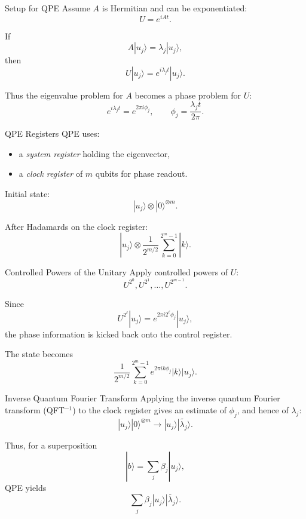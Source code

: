 \documentclass{beamer}
\begin{document}
\begin{frame}{Setup for QPE}
Assume \(A\) is Hermitian and can be exponentiated:
\[
U = e^{iAt}.
\]

If
\[
A|u_j\rangle = \lambda_j |u_j\rangle,
\]
then
\[
U|u_j\rangle = e^{i\lambda_j t}|u_j\rangle.
\]

Thus the eigenvalue problem for \(A\) becomes a phase problem for \(U\):
\[
e^{i\lambda_j t} = e^{2\pi i \phi_j},
\qquad
\phi_j = \frac{\lambda_j t}{2\pi}.
\]
\end{frame}


\begin{frame}{QPE Registers}
QPE uses:
\begin{itemize}
\item a \emph{system register} holding the eigenvector,
\item a \emph{clock register} of \(m\) qubits for phase readout.
\end{itemize}

Initial state:
\[
|u_j\rangle \otimes |0\rangle^{\otimes m}.
\]

After Hadamards on the clock register:
\[
|u_j\rangle \otimes
\frac{1}{2^{m/2}}
\sum_{k=0}^{2^m-1} |k\rangle.
\]
\end{frame}


\begin{frame}{Controlled Powers of the Unitary}
Apply controlled powers of \(U\):
\[
U^{2^0}, U^{2^1}, \dots, U^{2^{m-1}}.
\]

Since
\[
U^{2^\ell}|u_j\rangle = e^{2\pi i 2^\ell \phi_j}|u_j\rangle,
\]
the phase information is kicked back onto the control register.

The state becomes
\[
\frac{1}{2^{m/2}}
\sum_{k=0}^{2^m-1}
e^{2\pi i k \phi_j}
|k\rangle |u_j\rangle.
\]
\end{frame}


\begin{frame}{Inverse Quantum Fourier Transform}
Applying the inverse quantum Fourier transform (QFT\(^{-1}\)) to the clock register gives an estimate of \(\phi_j\), and hence of \(\lambda_j\):
\[
|u_j\rangle |0\rangle^{\otimes m}
\longrightarrow
|u_j\rangle |\widetilde{\lambda_j}\rangle.
\]

Thus, for a superposition
\[
|b\rangle = \sum_j \beta_j |u_j\rangle,
\]
QPE yields
\[
\sum_j \beta_j |u_j\rangle |\widetilde{\lambda_j}\rangle.
\]
\end{frame}
\end{document}
